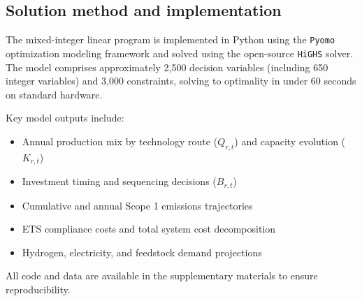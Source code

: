 \subsection{Solution method and implementation}

The mixed-integer linear program is implemented in Python using the \texttt{Pyomo} optimization modeling framework and solved using the open-source \texttt{HiGHS} solver. The model comprises approximately 2,500 decision variables (including 650 integer variables) and 3,000 constraints, solving to optimality in under 60 seconds on standard hardware.

Key model outputs include:
\begin{itemize}[leftmargin=*]
  \item Annual production mix by technology route ($Q_{r,t}$) and capacity evolution ($K_{r,t}$)
  \item Investment timing and sequencing decisions ($B_{r,t}$)
  \item Cumulative and annual Scope 1 emissions trajectories
  \item ETS compliance costs and total system cost decomposition
  \item Hydrogen, electricity, and feedstock demand projections
\end{itemize}

All code and data are available in the supplementary materials to ensure reproducibility.
